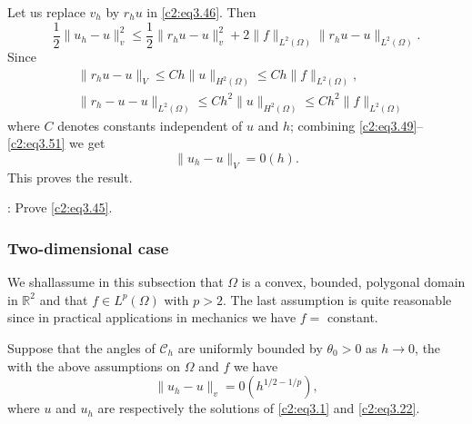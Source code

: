 Let us replace $v_h$ by $r_h u$  in \eqref{c2:eq3.46}. Then 
\begin{equation}
\frac{1}{2}\parallel u_h - u\parallel^2_v \leq \frac{1}{2} \parallel r_h u - u\parallel^2_v + 2
\parallel f\parallel_{L^2(\Omega)}\parallel r_h u -
u\parallel_{L^2(\Omega)}.\tag{3.49}\label{c2:eq3.49}  
\end{equation}
Since 
\begin{align*}
& \parallel r_h u - u\parallel_V \leq C h \parallel u\parallel_{H^2(\Omega)} \leq C h \parallel f
  \parallel_{L^2(\Omega)},  \tag{3.50}\label{c2:eq3.50}\\ 
& \parallel r_h - u - u\parallel_{L^2(\Omega)} \leq C h^2 \parallel u\parallel_{H^2 (\Omega)}\leq
  Ch^2 \parallel f\parallel_{L^2 (\Omega)} \tag{3.51}\label{c2:eq3.51} 
\end{align*}
where $C$ denotes constants independent of $u$ and $h$; combining
\eqref{c2:eq3.49}--\eqref{c2:eq3.51} we get  
$$
\parallel u_h - u\parallel_V = 0 (h).
$$
This proves the result.

\begin{exercise}:%
 Prove \eqref{c2:eq3.45}.
\end{exercise}

\subsubsection{Two-dimensional case}\label{c2:sss3.7.2}%
 We shall\pageoriginale   assume in this subsection that $\Omega$ is a convex,
 bounded, polygonal domain in $\mathbb{R}^2$ and that $f \in
 L^p(\Omega)$ with $p>2$. The last assumption is quite reasonable
 since in practical applications in mechanics we have $f=$ constant. 

\begin{theorem}\label{c2:thm3.5}%
Suppose that the angles of $\mathscr{C}_h$ are uniformly bounded by
$\theta_0 > 0$ as $h \to 0$, the with the above assumptions on
$\Omega$ and $f$ we have  
$$
\parallel u_h-u\parallel_v = 0(h^{1/2-1/p}),
$$
where $u$ and $u_h$  are respectively the solutions of \eqref{c2:eq3.1} and
\eqref{c2:eq3.22}.  
\end{theorem}

